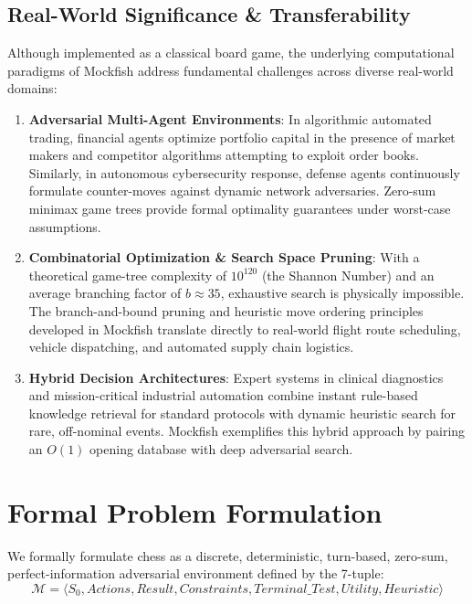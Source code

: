 \documentclass[11pt,a4paper]{article}
\begin{document}
\subsection{Real-World Significance \& Transferability}
Although implemented as a classical board game, the underlying computational paradigms of Mockfish address fundamental challenges across diverse real-world domains:
\begin{enumerate}[leftmargin=*]
    \item \textbf{Adversarial Multi-Agent Environments}: In algorithmic automated trading, financial agents optimize portfolio capital in the presence of market makers and competitor algorithms attempting to exploit order books. Similarly, in autonomous cybersecurity response, defense agents continuously formulate counter-moves against dynamic network adversaries. Zero-sum minimax game trees provide formal optimality guarantees under worst-case assumptions.
    \item \textbf{Combinatorial Optimization \& Search Space Pruning}: With a theoretical game-tree complexity of $10^{120}$ (the Shannon Number) and an average branching factor of $b \approx 35$, exhaustive search is physically impossible. The branch-and-bound pruning and heuristic move ordering principles developed in Mockfish translate directly to real-world flight route scheduling, vehicle dispatching, and automated supply chain logistics.
    \item \textbf{Hybrid Decision Architectures}: Expert systems in clinical diagnostics and mission-critical industrial automation combine instant rule-based knowledge retrieval for standard protocols with dynamic heuristic search for rare, off-nominal events. Mockfish exemplifies this hybrid approach by pairing an $O(1)$ opening database with deep adversarial search.
\end{enumerate}

\section{Formal Problem Formulation}

We formally formulate chess as a discrete, deterministic, turn-based, zero-sum, perfect-information adversarial environment defined by the 7-tuple:
$$\mathcal{M} = \langle S_0, Actions, Result, Constraints, Terminal\_Test, Utility, Heuristic \rangle$$
\end{document}
